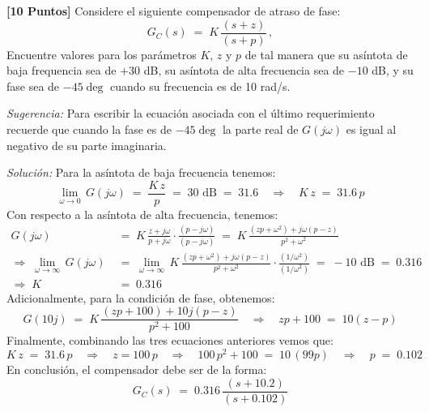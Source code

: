 \documentclass[ a4paper, twoside, 11pt]{article}
\begin{document}
\begin{problem}
\textbf{[10 Puntos]} Considere el siguiente compensador de atraso de fase: 
\[
G_C(s) \; = \; K \, \frac{(s+z)}{(s+p)} \, ,
\]
Encuentre valores para los par\'ametros $K$, $z$ y $p$ de tal manera que su as\'intota de baja frequencia sea de $+30$ dB, su as\'intota de alta frecuencia sea de $-10$ dB, y su fase sea de $-45\deg$ cuando su frecuencia es de 10 rad/s. 

\emph{Sugerencia:} Para escribir la ecuaci\'on asociada con el \'ultimo requerimiento recuerde que cuando la fase es de $-45\deg$ la parte real de $G( j \omega )$ es igual al negativo de su parte imaginaria. 

\emph{Soluci\'on:} Para la as\'intota de baja frecuencia tenemos: 
\[
\lim_{\omega \rightarrow 0} \, G( j\omega )
\; = \; \frac{K \, z}{p} \; = \; 30 \text{ dB}
\; = \; 31.6 \quad \Longrightarrow \quad
K \, z \; = \; 31.6 \, p
\]
Con respecto a la as\'intota de alta frecuencia, tenemos: 
\begin{align*}
G( j\omega ) \;
& = \; K \, \frac{z + j\omega}{p + j\omega} \cdot \frac{(p-j\omega)}{(p-j\omega)}
\; = \; K \, \frac{(zp + \omega^2) + j \omega (p-z)}{p^2 + \omega^2} \\[2ex]
\Longrightarrow \;
\lim_{\omega \rightarrow \infty} \, G( j\omega ) \;
& = \; \lim_{\omega \rightarrow \infty} \, K \, \frac{(zp + \omega^2) + j \omega (p-z)}{p^2 + \omega^2} \cdot \frac{(1/\omega^2)}{(1/\omega^2)} \; = \; -10 \text{ dB} \; = \; 0.316 \\[2ex]
\Longrightarrow \; K \; & = \; 0.316
\end{align*}
Adicionalmente, para la condici\'on de fase, obtenemos: 
\[
G(10j) \; = \; K \, \frac{(zp + 100) + 10j(p-z)}{p^2 + 100} \quad \Longrightarrow \quad
zp + 100 \; = \; 10(z-p)
\]
Finalmente, combinando las tres ecuaciones anteriores vemos que: 
\[
K \, z \; = \; 31.6 \, p
\quad \Longrightarrow \quad
z = 100 \, p
\quad \Longrightarrow \quad
100 \, p^2 + 100 \; = \; 10 \, (99p)
\quad \Longrightarrow \quad
p \; = \; 0.102
\]
En conclusi\'on, el compensador debe ser de la forma: 
\[
G_C(s) \; = \; 0.316 \, \frac{(s+10.2)}{(s+0.102)}
\]

\end{problem}
\vspace{\baselineskip}
\end{document}
